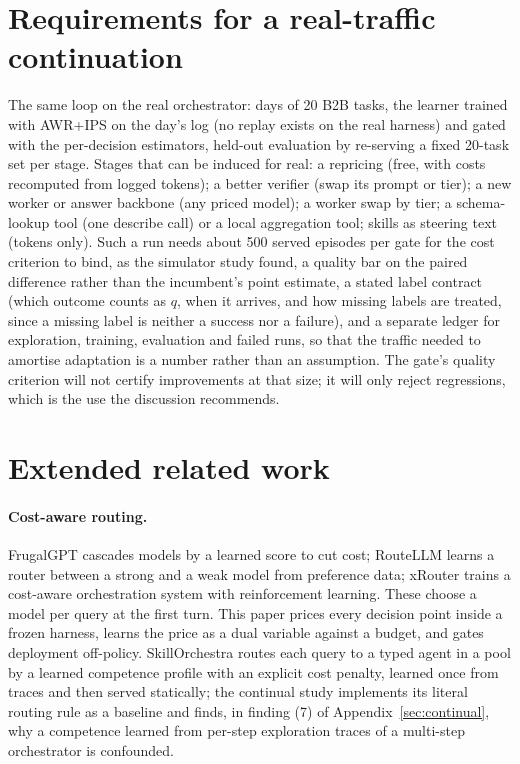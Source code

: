 \documentclass[10pt]{article}
\begin{document}
\section{Requirements for a real-traffic continuation}
\label{app:phaseb}
\label{sec:phaseb}

The same loop on the real orchestrator: days of 20 B2B tasks, the learner trained with AWR+IPS on the day's log (no replay exists on the real harness) and gated with the per-decision estimators, held-out evaluation by re-serving a fixed 20-task set per stage. Stages that can be induced for real: a repricing (free, with costs recomputed from logged tokens); a better verifier (swap its prompt or tier); a new worker or answer backbone (any priced model); a worker swap by tier; a schema-lookup tool (one describe call) or a local aggregation tool; skills as steering text (tokens only). Such a run needs about 500 served episodes per gate for the cost criterion to bind, as the simulator study found, a quality bar on the paired difference rather than the incumbent's point estimate, a stated label contract (which outcome counts as $q$, when it arrives, and how missing labels are treated, since a missing label is neither a success nor a failure), and a separate ledger for exploration, training, evaluation and failed runs, so that the traffic needed to amortise adaptation is a number rather than an assumption. The gate's quality criterion will not certify improvements at that size; it will only reject regressions, which is the use the discussion recommends.

\section{Extended related work}
\label{app:related}

\paragraph{Cost-aware routing.} FrugalGPT \citep{frugalgpt2023} cascades models by a learned score to cut cost; RouteLLM \citep{routellm2024} learns a router between a strong and a weak model from preference data; xRouter \citep{xrouter2025} trains a cost-aware orchestration system with reinforcement learning. These choose a model per query at the first turn. This paper prices every decision point inside a frozen harness, learns the price as a dual variable against a budget, and gates deployment off-policy. SkillOrchestra \citep{skillorchestra2026} routes each query to a typed agent in a pool by a learned competence profile with an explicit cost penalty, learned once from traces and then served statically; the continual study implements its literal routing rule as a baseline and finds, in finding (7) of Appendix~\ref{sec:continual}, why a competence learned from per-step exploration traces of a multi-step orchestrator is confounded.
\end{document}
